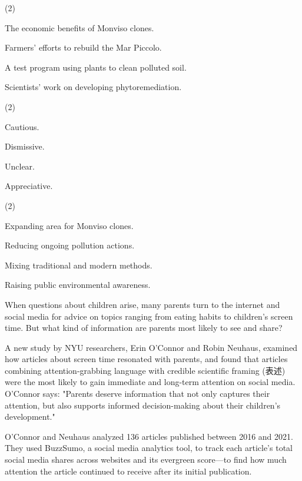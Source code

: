 \documentclass{英语试卷}
\begin{document}
\begin{choices}(2)
  \item The economic benefits of Monviso clones.
  \item Farmers' efforts to rebuild the Mar Piccolo.
  \item A test program using plants to clean polluted soil.
  \item Scientists' work on developing phytoremediation.
\end{choices}
\begin{choices}(2)
  \item Cautious.
  \item Dismissive.
  \item Unclear.
  \item Appreciative.
\end{choices}
\begin{choices}(2)
  \item Expanding area for Monviso clones.
  \item Reducing ongoing pollution actions.
  \item Mixing traditional and modern methods.
  \item Raising public environmental awareness.
\end{choices}
\par When questions about children arise, many parents turn to the internet and social media for advice on topics ranging from eating habits to children's screen time. But what kind of information are parents most likely to see and share?\par
\par A new study by NYU researchers, Erin O'Connor and Robin Neuhaus, examined how articles about screen time resonated with parents, and found that articles combining attention-grabbing language with credible scientific framing (表述) were the most likely to gain immediate and long-term attention on social media. O'Connor says: "Parents deserve information that not only captures their attention, but also supports informed decision-making about their children's development."\par
\par O'Connor and Neuhaus analyzed 136 articles published between 2016 and 2021. They used BuzzSumo, a social media analytics tool, to track each article's total social media shares across websites and its evergreen score—to find how much attention the article continued to receive after its initial publication.\par
\end{document}
